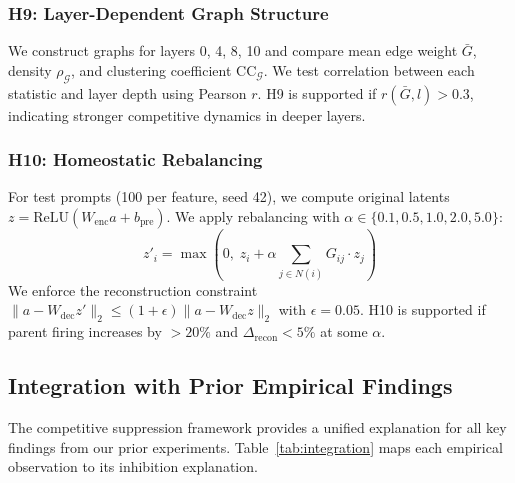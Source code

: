 \documentclass{article}
\begin{document}
\subsubsection{H9: Layer-Dependent Graph Structure}

We construct graphs for layers 0, 4, 8, 10 and compare mean edge weight $\bar{G}$, density $\rho_{\mathcal{G}}$, and clustering coefficient $\text{CC}_{\mathcal{G}}$. We test correlation between each statistic and layer depth using Pearson $r$. H9 is supported if $r(\bar{G}, l) > 0.3$, indicating stronger competitive dynamics in deeper layers.

\subsubsection{H10: Homeostatic Rebalancing}

For test prompts (100 per feature, seed 42), we compute original latents $z = \text{ReLU}(W_{\text{enc}} a + b_{\text{pre}})$. We apply rebalancing with $\alpha \in \{0.1, 0.5, 1.0, 2.0, 5.0\}$:
\begin{equation}
z'_i = \max\left(0, \; z_i + \alpha \sum_{j \in N(i)} G_{ij} \cdot z_j\right)
\end{equation}
We enforce the reconstruction constraint $\|a - W_{\text{dec}} z'\|_2 \leq (1 + \epsilon) \|a - W_{\text{dec}} z\|_2$ with $\epsilon = 0.05$. H10 is supported if parent firing increases by $>20\%$ and $\Delta_{\text{recon}} < 5\%$ at some $\alpha$.

\subsection{Integration with Prior Empirical Findings}
\label{sec:integration}

The competitive suppression framework provides a unified explanation for all key findings from our prior experiments. Table~\ref{tab:integration} maps each empirical observation to its inhibition explanation.
\end{document}
